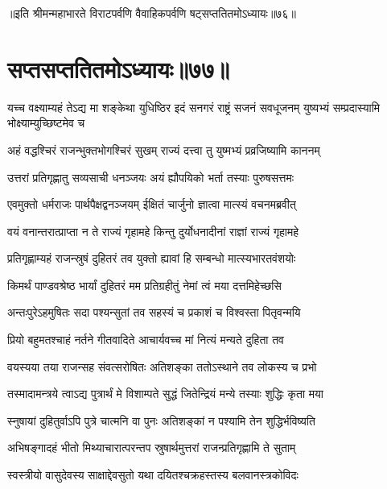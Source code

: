 ॥इति श्रीमन्महाभारते विराटपर्वणि वैवाहिकपर्वणि षट्सप्ततितमोऽध्यायः॥७६॥

\chapter{सप्तसप्ततितमोऽध्यायः॥७७॥}

\threelineshloka
{यच्च वक्ष्याम्यहं तेऽद्य मा शङ्केथा युधिष्ठिर}
{इदं सनगरं राष्ट्रं सजनं सवधूजनम्}
{युष्यभ्यं सम्प्रदास्यामि भोक्ष्याम्युच्छिष्टमेव च}


\twolineshloka
{अहं वद्धश्चिरं राजन्भुक्तभोगश्चिरं सुखम्}
{राज्यं दत्त्वा तु युष्मभ्यं प्रव्रजिष्यामि काननम्}


\twolineshloka
{उत्तरां प्रतिगृह्णातु सव्यसाची धनञ्जयः}
{अयं ह्यौपयिको भर्ता तस्याः पुरुषसत्तमः}



\twolineshloka
{एवमुक्तो धर्मराजः पार्थपैक्षद्वनञ्जयम्}
{ईक्षितं चार्जुनो ज्ञात्वा मात्स्यं वचनमब्रवीत्}


\twolineshloka
{वयं वनान्तरात्प्राप्ता न ते राज्यं गृहामहे}
{किन्तु दुर्योधनादीनां राज्ञां राज्यं गृहामहे}


\twolineshloka
{प्रतिगृह्णाम्यहं राजन्स्रुषं दुहितरं तव}
{युक्तो ह्यावां हि सम्बन्धो मात्स्यभारतवंशयोः}




\twolineshloka
{किमर्थं पाण्डवश्रेष्ठ भार्यां दुहितरं मम}
{प्रतिग्रहीतुं नेमां त्वं मया दत्तमिहेच्छसि}




\twolineshloka
{अन्तःपुरेऽहमुषितः सदा पश्यन्सुतां तव}
{सहस्यं च प्रकाशं च विश्वस्ता पितृवन्मयि}


\twolineshloka
{प्रियो बहुमतश्चाहं नर्तने गीतवादिते}
{आचार्यवच्च मां नित्यं मन्यते दुहिता तव}


\twolineshloka
{वयस्यया तया राजन्सह संवत्सरोषितः}
{अतिशङ्का ततोऽस्थाने तव लोकस्य च प्रभो}


\twolineshloka
{तस्मादामन्त्रये त्वाऽद्य पुत्रार्थं मे विशाम्पते}
{सुद्धं जितेन्द्रियं मन्ये तस्याः शुद्धिः कृता मया}


\twolineshloka
{स्नुषायां दुहितुर्वाऽपि पुत्रे चात्मनि वा पुनः}
{अतिशङ्कां न पश्यामि तेन शुद्धिर्भविष्यति}


\twolineshloka
{अभिषङ्गादहं भीतो मिथ्याचारात्परन्तप}
{स्रुषार्थमुत्तरां राजन्प्रतिगृह्णामि ते सुताम्}


\twolineshloka
{स्वस्त्रीयो वासुदेवस्य साक्षाद्देवसुतो यथा}
{दयितश्चक्रहस्तस्य बलवानस्त्रकोविदः}


